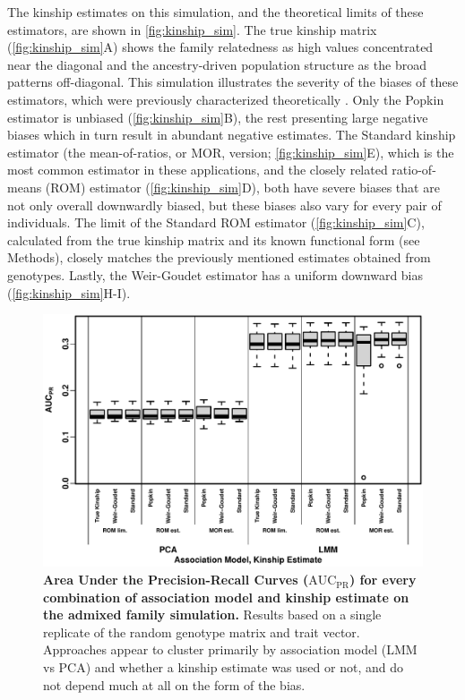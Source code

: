 \documentclass[11pt]{article}
\newcommand{\auc}{\text{AUC}_\text{PR}}
\begin{document}
The kinship estimates on this simulation, and the theoretical limits of these estimators, are shown in \cref{fig:kinship_sim}.
The true kinship matrix (\cref{fig:kinship_sim}A) shows the family relatedness as high values concentrated near the diagonal and the ancestry-driven population structure as the broad patterns off-diagonal.
This simulation illustrates the severity of the biases of these estimators, which were previously characterized theoretically \citep{ochoa_estimating_2021}.
Only the Popkin estimator is unbiased (\cref{fig:kinship_sim}B), the rest presenting large negative biases which in turn result in abundant negative estimates.
The Standard kinship estimator (the mean-of-ratios, or MOR, version; \cref{fig:kinship_sim}E), which is the most common estimator in these applications, and the closely related ratio-of-means (ROM) estimator (\cref{fig:kinship_sim}D), both have severe biases that are not only overall downwardly biased, but these biases also vary for every pair of individuals.
The limit of the Standard ROM estimator (\cref{fig:kinship_sim}C), calculated from the true kinship matrix and its known functional form (see Methods), closely matches the previously mentioned estimates obtained from genotypes.
Lastly, the Weir-Goudet estimator has a uniform downward bias (\cref{fig:kinship_sim}H-I).


\begin{figure}[bp!]
  \centering
  \includegraphics[width=\textwidth]{sim-admix-n1000-m100000-k3-f0.3-s0.5-mc100-h0.8-g20-fes/auc.pdf}
  \caption{
    {\bf Area Under the Precision-Recall Curves ($\auc$) for every combination of association model and kinship estimate on the admixed family simulation.}
    Results based on a single replicate of the random genotype matrix and trait vector.
    Approaches appear to cluster primarily by association model (LMM vs PCA) and whether a kinship estimate was used or not, and do not depend much at all on the form of the bias.
  }
  \label{fig:auc_sim}
\end{figure}
\end{document}
